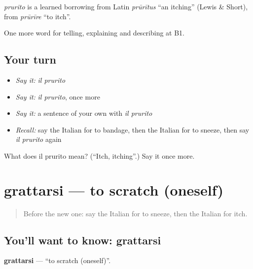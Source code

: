 \begin{cousinweb}
\emph{prurito} is a learned borrowing from Latin \emph{prūrītus} \textquotedblleft{}an itching\textquotedblright{} (Lewis \& Short), from \emph{prūrīre} \textquotedblleft{}to itch\textquotedblright{}.
\end{cousinweb}

\begin{grammarlens}[title={What you've built}]
One more word for telling, explaining and describing at B1.
\end{grammarlens}

\subsection*{Your turn}
\begin{itemize}
\raggedright
  \item \emph{Say it:} \emph{il prurito}
  \item \emph{Say it:} \emph{il prurito}, once more
  \item \emph{Say it:} a sentence of your own with \emph{il prurito}
  \item \emph{Recall:} say the Italian for to bandage, then the Italian for to sneeze, then say \emph{il prurito} again
\end{itemize}

\begin{tcolorbox}[breakable,colback=teal!4,colframe=teal!35!black,title={Before you move on}]
What does il prurito mean? (\textquotedblleft{}Itch, itching\textquotedblright{}.) Say it once more.
\end{tcolorbox}
\section[grattarsi]{grattarsi — to scratch (oneself)}

\label{lesson:IT-C486-grattarsi}



\begin{quote}
Before the new one: say the Italian for to sneeze, then the Italian for itch.
\end{quote}

\subsection*{You'll want to know: grattarsi}
\textbf{grattarsi} — \textquotedblleft{}to scratch (oneself)\textquotedblright{}.

